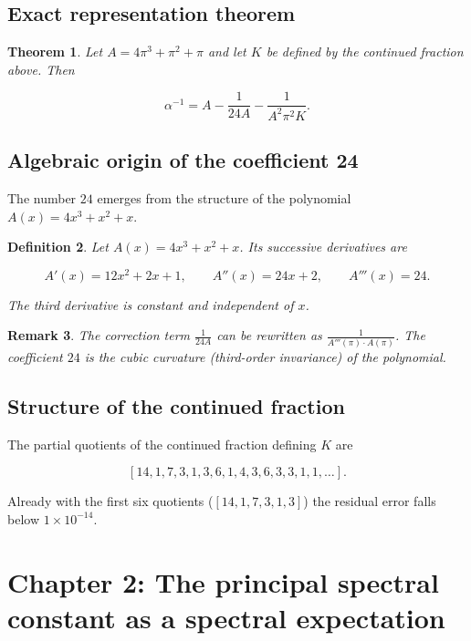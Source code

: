 \documentclass[12pt]{article}
\numberwithin{equation}{section}
\newtheorem{theorem}{Theorem}[section]
\newtheorem{definition}[theorem]{Definition}
\newtheorem{remark}[theorem]{Remark}
\begin{document}
\subsection{Exact representation theorem}

\begin{theorem}\label{thm:ch1}
Let \(A = 4\pi^3 + \pi^2 + \pi\) and let \(K\) be defined by the continued fraction above. Then

\[
\alpha^{-1} = A - \frac{1}{24A} - \frac{1}{A^2 \pi^2 K}.
\]

\end{theorem}

\subsection{Algebraic origin of the coefficient 24}

The number \(24\) emerges from the structure of the polynomial \(A(x)=4x^3+x^2+x\).

\begin{definition}\label{def:poly}
Let \(A(x)=4x^3+x^2+x\). Its successive derivatives are

\[
A'(x)=12x^2+2x+1,\qquad A''(x)=24x+2,\qquad A'''(x)=24.
\]

The third derivative is constant and independent of \(x\).
\end{definition}

\begin{remark}
The correction term \(\frac{1}{24A}\) can be rewritten as \(\frac{1}{A'''(\pi)\cdot A(\pi)}\). The coefficient \(24\) is the cubic curvature (third-order invariance) of the polynomial.
\end{remark}

\subsection{Structure of the continued fraction}

The partial quotients of the continued fraction defining \(K\) are

\[
[14, 1, 7, 3, 1, 3, 6, 1, 4, 3, 6, 3, 3, 1, 1, \dots].
\]

Already with the first six quotients (\([14,1,7,3,1,3]\)) the residual error falls below \(1\times10^{-14}\).

\newpage

\section{Chapter 2: The principal spectral constant as a spectral expectation}
\end{document}
